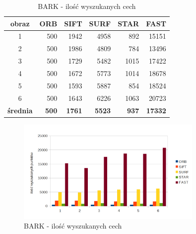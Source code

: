 \begin{table}[htbp]
  \centering
  \caption{BARK - ilość wyszukanych cech}
    \begin{tabular}{|c|r|r|r|r|r|}\hline
    
    obraz & \textbf{ORB} & \textbf{SIFT} & \textbf{SURF} & \textbf{STAR} & \textbf{FAST} \\\hline
    
    1 & 500 & 1942 & 4958 & 892 & 15151 \\
    2 & 500 & 1986 & 4809 & 784 & 13496 \\
    3 & 500 & 1729 & 5482 & 1015 & 17422 \\
    4 & 500 & 1672 & 5773 & 1014 & 18678 \\
    5 & 500 & 1593 & 5887 & 854 & 18524 \\
    6 & 500 & 1643 & 6226 & 1063 & 20723 \\\hline
    \textbf{średnia} & \textbf{500} & \textbf{1761} & \textbf{5523} & \textbf{937} & \textbf{17332} \\\hline
    
    \end{tabular}%
  \label{tab:bark_f1}%
\end{table}%


\begin{figure}
\centering
\includegraphics[width=0.8\textwidth]{pict/mikolajczyk/bark/f1.png}
\caption{BARK - ilość wyszukanych cech}
\label{fig:bark_f1}
\end{figure}


